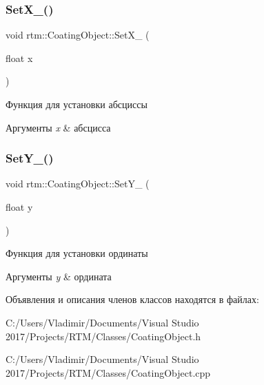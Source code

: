 \subsubsection{\texorpdfstring{Set\+X\+\_\+()}{SetX\_()}}
{\footnotesize\ttfamily void rtm\+::\+Coating\+Object\+::\+Set\+X\+\_\+ (\begin{DoxyParamCaption}\item[{float}]{x }\end{DoxyParamCaption})\hspace{0.3cm}{\ttfamily [private]}}



Функция для установки абсциссы 


\begin{DoxyParams}{Аргументы}
{\em x} & абсцисса \\
\hline
\end{DoxyParams}
\mbox{\label{classrtm_1_1_coating_object_a3f67f750f8bf4b87a55655018c0c8d71}} 
\subsubsection{\texorpdfstring{Set\+Y\+\_\+()}{SetY\_()}}
{\footnotesize\ttfamily void rtm\+::\+Coating\+Object\+::\+Set\+Y\+\_\+ (\begin{DoxyParamCaption}\item[{float}]{y }\end{DoxyParamCaption})\hspace{0.3cm}{\ttfamily [private]}}



Функция для установки ординаты 


\begin{DoxyParams}{Аргументы}
{\em y} & ордината \\
\hline
\end{DoxyParams}


Объявления и описания членов классов находятся в файлах\+:\begin{DoxyCompactItemize}
\item 
C\+:/\+Users/\+Vladimir/\+Documents/\+Visual Studio 2017/\+Projects/\+R\+T\+M/\+Classes/Coating\+Object.\+h\item 
C\+:/\+Users/\+Vladimir/\+Documents/\+Visual Studio 2017/\+Projects/\+R\+T\+M/\+Classes/Coating\+Object.\+cpp\end{DoxyCompactItemize}

